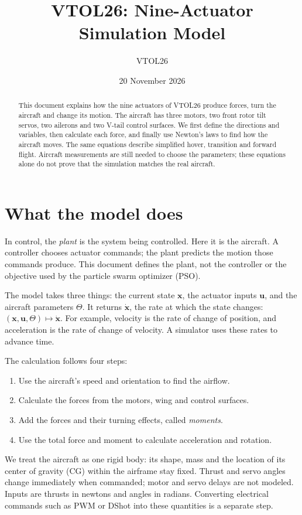 \documentclass[11pt,a4paper]{article}
\title{VTOL26: Nine-Actuator Simulation Model}
\author{VTOL26}
\date{20 November 2026}
\numberwithin{equation}{section}
\newcommand{\vect}[1]{\boldsymbol{#1}}
\begin{document}
\maketitle

\begin{abstract}
This document explains how the nine actuators of VTOL26 produce forces, turn
the aircraft and change its motion. The aircraft has three motors, two front
rotor tilt servos, two ailerons and two V-tail control surfaces. We first
define the directions and variables, then calculate each force, and finally
use Newton's laws to find how the aircraft moves. The same equations describe
simplified hover, transition and forward flight. Aircraft measurements are
still needed to choose the parameters; these equations alone do not prove
that the simulation matches the real aircraft.
\end{abstract}

\section{What the model does}
In control, the \emph{plant} is the system being controlled. Here it is the
aircraft. A controller chooses actuator commands; the plant predicts the
motion those commands produce. This document defines the plant, not the
controller or the objective used by the particle swarm optimizer (PSO).

The model takes three things: the current state $\vect x$, the actuator inputs
$\vect u$, and the aircraft parameters $\Theta$. It returns
$\dot{\vect x}$, the rate at which the state changes:
$(\vect x,\vect u,\Theta)\mapsto\dot{\vect x}$.
For example, velocity is the rate of change of position, and acceleration is
the rate of change of velocity. A simulator uses these rates to advance time.

The calculation follows four steps:
\begin{enumerate}
  \item Use the aircraft's speed and orientation to find the airflow.
  \item Calculate the forces from the motors, wing and control surfaces.
  \item Add the forces and their turning effects, called \emph{moments}.
  \item Use the total force and moment to calculate acceleration and rotation.
\end{enumerate}

We treat the aircraft as one rigid body: its shape, mass and the location of
its center of gravity (CG) within the airframe stay fixed.
Thrust and servo angles change immediately when commanded;
motor and servo delays are not modeled. Inputs are thrusts in newtons and
angles in radians. Converting electrical commands such as PWM or DShot into
these quantities is a separate step.
\end{document}
